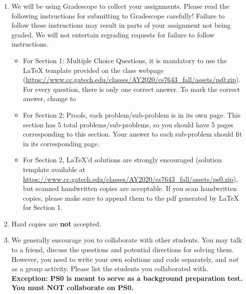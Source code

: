 \documentclass[11pt,english, answers]{exam}
\begin{document}
\begin{enumerate}
\item We will be using Gradescope to collect your assignments.  Please read the following instructions for submitting to Gradescope carefully! Failure to follow these instructions may result in parts of your assignment not being graded. We will not entertain regrading requests for failure to follow instructions.
     \begin{itemize}
     	 \item 
	     	 For Section 1: Multiple Choice Questions, it is mandatory to use the {\LaTeX} template provided on the class webpage (\url{https://www.cc.gatech.edu/classes/AY2020/cs7643_fall/assets/ps0.zip}).
	     	  For every question, there is only one correct answer. To mark the correct answer, change \codeword{\choice} to \codeword{\CorrectChoice}
	  
          \item
               For Section 2: Proofs, each problem/sub-problem is in its own page.
               This section has 5 total problems/sub-problems, so you should have  5 pages corresponding to this section. Your answer to each sub-problem should fit in its corresponding page. 
          \item For Section 2, \LaTeX'd  solutions are strongly encouraged (solution template
          available at \\
          \url{https://www.cc.gatech.edu/classes/AY2020/cs7643_fall/assets/ps0.zip}),
          but scanned handwritten copies are acceptable. If you scan handwritten copies, please make sure to append them to the pdf generated by {\LaTeX} for Section 1. 
    
     \end{itemize}


\item Hard copies are \textbf{not} accepted.
\item We generally encourage you to collaborate with other students. You may talk to a friend,
discuss the questions and potential directions for solving them. However, you need to write
your own solutions and code separately, and \emph{not} as a group activity.
Please list the students you collaborated with. \\
\textbf{Exception: PS0 is meant to serve as a background preparation test. You must NOT collaborate on PS0.}

\end{enumerate}

\pagebreak


%
%
\end{document}
